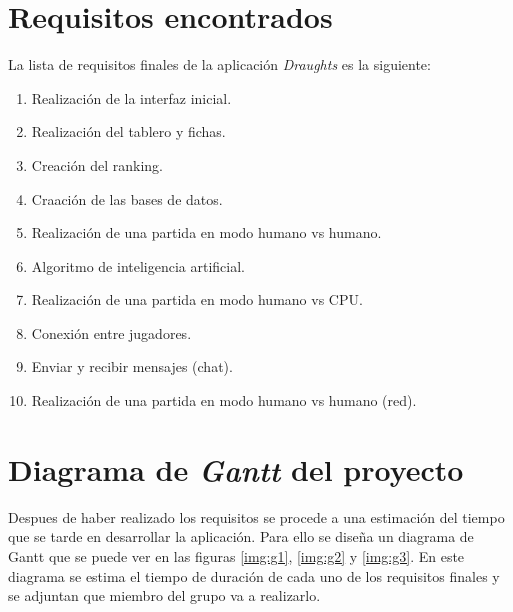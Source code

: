 \section{Requisitos encontrados}
La lista de requisitos finales de la aplicación \emph{Draughts} es la siguiente:
\begin{enumerate}
\item Realización de la interfaz inicial.
\item Realización del tablero y fichas.
\item Creación del ranking.
\item Craación de las bases de datos.
\item Realización de una partida en modo humano vs humano.
\item Algoritmo de inteligencia artificial.
\item Realización de una partida en modo humano vs CPU.
\item Conexión entre jugadores.
\item Enviar y recibir mensajes (chat).
\item Realización de una partida en modo humano vs humano (red).
\end{enumerate}

\section{Diagrama de \emph{Gantt} del proyecto}
Despues de haber realizado los requisitos se procede a una estimación del tiempo
que se tarde en desarrollar la aplicación. Para ello se diseña un diagrama de 
Gantt que se puede ver en las figuras \ref{img:g1}, \ref{img:g2} y \ref{img:g3}.
En este diagrama se estima el tiempo de duración de cada uno de los requisitos
finales y se adjuntan que miembro del grupo va a realizarlo.
\begin{sidewaysfigure}
\end{sidewaysfigure}
\begin{sidewaysfigure}
\end{sidewaysfigure}
\begin{sidewaysfigure}
\end{sidewaysfigure}

